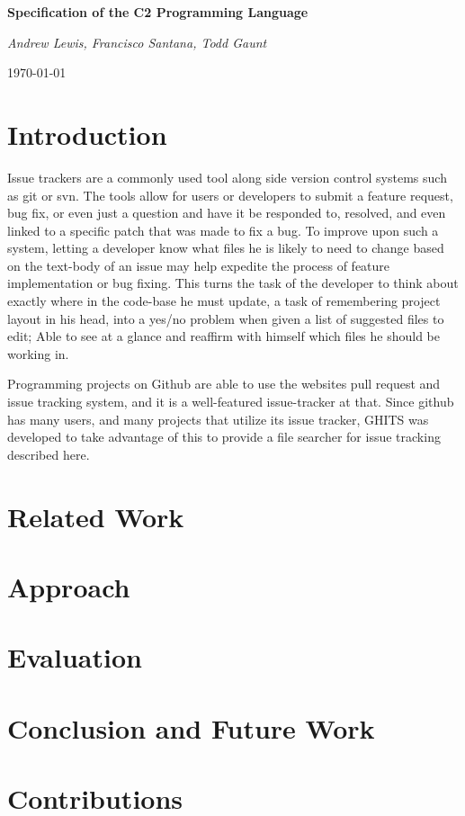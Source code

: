 \documentclass[10pt,a4paper]{article}
\begin{document}
\begin{center}
  {\huge\bfseries Specification of the C2 Programming Language\par}
  \vspace{1cm}
  {\Large\itshape Andrew Lewis, Francisco Santana, Todd Gaunt\par}
  \vspace{0.5cm}
  {\large\today\par}
\end{center}

\section{Introduction}
Issue trackers are a commonly used tool along side version control systems such
as git or svn. The tools allow for users or developers to submit a feature
request, bug fix, or even just a question and have it be responded to, resolved,
and even linked to a specific patch that was made to fix a bug. To improve upon
such a system, letting a developer know what files he is likely to need to change
based on the text-body of an issue may help expedite the process of feature
implementation or bug fixing. This turns the task of the developer to think about
exactly where in the code-base he must update, a task of remembering project
layout in his head, into a yes/no problem when given a list of suggested files
to edit; Able to see at a glance and reaffirm with himself which files he should
be working in.

Programming projects on Github are able to use the websites pull request and
issue tracking system, and it is a well-featured issue-tracker at that. Since
github has many users, and many projects that utilize its issue tracker, GHITS
was developed to take advantage of this to provide a file searcher for
issue tracking described here.
\section{Related Work}
\section{Approach}
\section{Evaluation}
\section{Conclusion and Future Work}
\section{Contributions}
\end{document}
